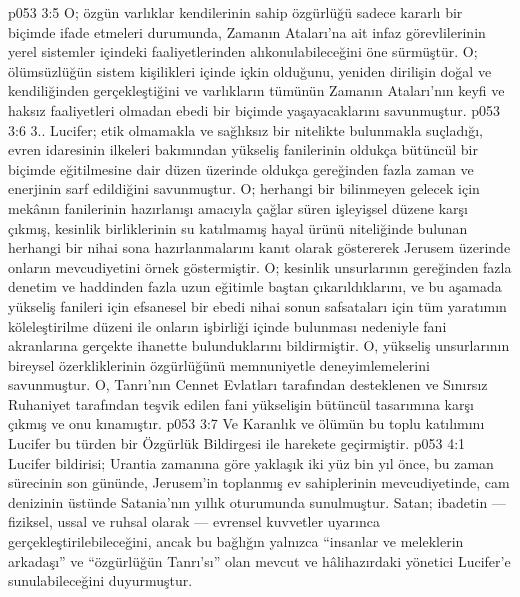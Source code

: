 \vs p053 3:5 O; özgün varlıklar kendilerinin sahip özgürlüğü sadece kararlı bir biçimde ifade etmeleri durumunda, Zamanın Ataları’na ait infaz görevlilerinin yerel sistemler içindeki faaliyetlerinden alıkonulabileceğini öne sürmüştür. O; ölümsüzlüğün sistem kişilikleri içinde içkin olduğunu, yeniden dirilişin doğal ve kendiliğinden gerçekleştiğini ve varlıkların tümünün Zamanın Ataları’nın keyfi ve haksız faaliyetleri olmadan ebedi bir biçimde yaşayacaklarını savunmuştur.
\vs p053 3:6 3.\bibnobreakspace {}. Lucifer; etik olmamakla ve sağlıksız bir nitelikte bulunmakla suçladığı, evren idaresinin ilkeleri bakımından yükseliş fanilerinin oldukça bütüncül bir biçimde eğitilmesine dair düzen üzerinde oldukça gereğinden fazla zaman ve enerjinin sarf edildiğini savunmuştur. O; herhangi bir bilinmeyen gelecek için mekânın fanilerinin hazırlanışı amacıyla çağlar süren işleyişsel düzene karşı çıkmış, kesinlik birliklerinin su katılmamış hayal ürünü niteliğinde bulunan herhangi bir nihai sona hazırlanmalarını kanıt olarak göstererek Jerusem üzerinde onların mevcudiyetini örnek göstermiştir. O; kesinlik unsurlarının gereğinden fazla denetim ve haddinden fazla uzun eğitimle baştan çıkarıldıklarını, ve bu aşamada yükseliş fanileri için efsanesel bir ebedi nihai sonun safsataları için tüm yaratımın köleleştirilme düzeni ile onların işbirliği içinde bulunması nedeniyle fani akranlarına gerçekte ihanette bulunduklarını bildirmiştir. O, yükseliş unsurlarının bireysel özerkliklerinin özgürlüğünü memnuniyetle deneyimlemelerini savunmuştur. O, Tanrı’nın Cennet Evlatları tarafından desteklenen ve Sınırsız Ruhaniyet tarafından teşvik edilen fani yükselişin bütüncül tasarımına karşı çıkmış ve onu kınamıştır.
\vs p053 3:7 Ve Karanlık ve ölümün bu toplu katılımını Lucifer bu türden bir Özgürlük Bildirgesi ile harekete geçirmiştir.
\vs p053 4:1 Lucifer bildirisi; Urantia zamanına göre yaklaşık iki yüz bin yıl önce, bu zaman sürecinin son gününde, Jerusem’in toplanmış ev sahiplerinin mevcudiyetinde, cam denizinin üstünde Satania’nın yıllık oturumunda sunulmuştur. Satan; ibadetin --- fiziksel, ussal ve ruhsal olarak --- evrensel kuvvetler uyarınca gerçekleştirilebileceğini, ancak bu bağlığın yalnızca “insanlar ve meleklerin arkadaşı” ve “özgürlüğün Tanrı’sı” olan mevcut ve hâlihazırdaki yönetici Lucifer’e sunulabileceğini duyurmuştur.
